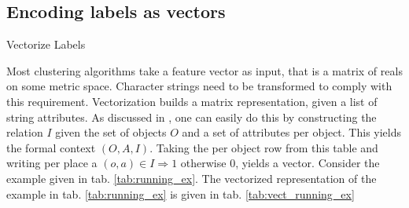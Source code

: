 \subsection{Encoding labels as vectors}
\begin{algorithm}[h]
\caption{Vectorize Labels}\label{vect}
\end{algorithm} 
Most clustering algorithms take a feature vector as input, that is a matrix of reals on some metric space. Character strings need to be transformed to comply with this requirement. Vectorization builds a matrix representation, given a list of string attributes.
As discussed in , one can easily do this by constructing the relation $I$ given the set of objects $O$ and a set of attributes per object. This yields the formal context $(O, A, I)$. Taking the per object row from this table and writing per place a $(o,a) \in I \Rightarrow 1$ otherwise $0$, yields a vector.
Consider the example given in tab. \ref{tab:running_ex}. The vectorized representation of the example in tab. \ref{tab:running_ex} is given in tab. \ref{tab:vect_running_ex}
